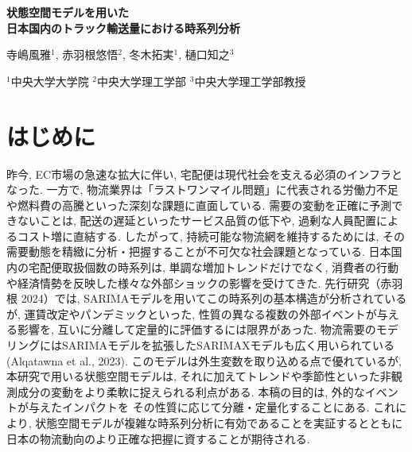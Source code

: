 \documentclass[a4paper, 10pt]{jarticle}
\begin{document}
\begin{center}
  \bfseries 
  {\huge 状態空間モデルを用いた\\日本国内のトラック輸送量における時系列分析} 
  \vspace{3ex} %

  寺嶋風雅$^{1}$, 赤羽根悠悟$^{2}$, 冬木拓実$^{1}$, 樋口知之$^{3}$
  \vspace{1.5ex} %

  {\small 
    $^{1}$中央大学大学院 \quad 
    $^{2}$中央大学理工学部 \quad 
    $^{3}$中央大学理工学部教授
  }
\end{center}

\section{はじめに} 
\titlespacing*{\section}{0pt}{1.0ex}{0.8ex}
昨今, EC市場の急速な拡大に伴い, 宅配便は現代社会を支える必須のインフラとなった. 
一方で, 物流業界は「ラストワンマイル問題」に代表される労働力不足や燃料費の高騰といった深刻な課題に直面している. 
需要の変動を正確に予測できないことは, 配送の遅延といったサービス品質の低下や, 過剰な人員配置によるコスト増に直結する. 
したがって, 持続可能な物流網を維持するためには, その需要動態を精緻に分析・把握することが不可欠な社会課題となっている. 
日本国内の宅配便取扱個数の時系列は, 単調な増加トレンドだけでなく, 
消費者の行動や経済情勢を反映した様々な外部ショックの影響を受けてきた. 
先行研究（赤羽根 2024）では, SARIMAモデルを用いてこの時系列の基本構造が分析されているが, 
運賃改定やパンデミックといった, 性質の異なる複数の外部イベントが与える影響を, 互いに分離して定量的に評価するには限界があった. 
物流需要のモデリングにはSARIMAモデルを拡張したSARIMAXモデルも広く用いられている(Alqatawna et al., 2023). 
このモデルは外生変数を取り込める点で優れているが, 本研究で用いる状態空間モデルは, 
それに加えてトレンドや季節性といった非観測成分の変動をより柔軟に捉えられる利点がある.
 本稿の目的は, 外的なイベントが与えたインパクトを
その性質に応じて分離・定量化することにある. これにより, 状態空間モデルが複雑な時系列分析に有効であることを実証するとともに
日本の物流動向のより正確な把握に資することが期待される. 
\end{document}
